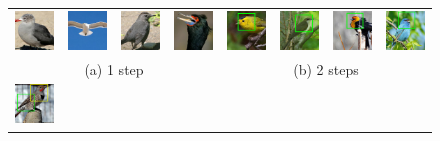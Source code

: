 \documentclass[10pt,twocolumn,letterpaper]{article}
\begin{document}
\begin{figure}[t]
  \centering
  \begin{tabular}{c c c c c c c c}
    \includegraphics[height=0.11\linewidth]{figs/exp/img/1/219.jpg} &
    \includegraphics[height=0.11\linewidth]{figs/exp/img/1/1703.jpg} &
    \includegraphics[height=0.11\linewidth]{figs/exp/img/1/1850.jpg} &
    \includegraphics[height=0.11\linewidth]{figs/exp/img/1/4361.jpg} & \hspace{10pt}
    \includegraphics[height=0.11\linewidth]{figs/exp/img/2/18_21.jpg} &
    \includegraphics[height=0.11\linewidth]{figs/exp/img/2/24_21.jpg} &
    \includegraphics[height=0.11\linewidth]{figs/exp/img/2/265_21.jpg} &
    \includegraphics[height=0.11\linewidth]{figs/exp/img/2/399_21.jpg} \\
    \multicolumn{4}{c}{(a) 1 step}  & \multicolumn{4}{c}{(b) 2 steps} \\
    \includegraphics[height=0.11\linewidth]{figs/exp/img/3/50_20.jpg} &

\end{tabular}
\end{figure}
\end{document}
